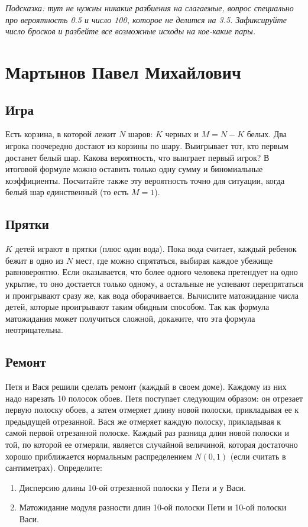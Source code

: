 \documentclass[12pt]{article}
\begin{document}
\emph{Подсказка: тут не нужны никакие разбиения на слагаемые, вопрос специально про вероятность 0.5 и число 100, которое не делится на 3.5. Зафиксируйте число бросков и разбейте все возможные исходы на кое-какие пары.}

\newpage
\section{Мартынов Павел Михайлович}

\subsection{Игра}
Есть корзина, в которой лежит $N$ шаров: $K$ черных и $M = N - K$ белых. Два игрока поочередно достают из корзины по шару. Выигрывает тот, кто первым достанет белый шар. Какова вероятность, что выиграет первый игрок? В итоговой формуле можно оставить только одну сумму и биномиальные коэффициенты. Посчитайте также эту вероятность точно для ситуации, когда белый шар единственный (то есть $M = 1$).

\subsection{Прятки}
$K$ детей играют в прятки (плюс один вода). Пока вода считает, каждый ребенок бежит в одно из $N$ мест, где можно спрятаться, выбирая каждое убежище равновероятно. Если оказывается, что более одного человека претендует на одно укрытие, то оно достается только одному, а остальные не успевают перепрятаться и проигрывают сразу же, как вода оборачивается. Вычислите матожидание числа детей, которые проигрывают таким обидным способом. Так как формула матожидания может получиться сложной, докажите, что эта формула неотрицательна.

\subsection{Ремонт}
Петя и Вася решили сделать ремонт (каждый в своем доме). Каждому из них надо нарезать 10 полосок обоев. Петя поступает следующим образом: он отрезает первую полоску обоев, а затем отмеряет длину новой полоски, прикладывая ее к предыдущей отрезанной. Вася же отмеряет каждую полоску, прикладывая к самой первой отрезанной полоске. Каждый раз разница длин новой полоски и той, по которой ее отмеряли, является случайной величиной, которая достаточно хорошо приближается нормальным распределением $N(0, 1)$ (если считать в сантиметрах). Определите:
\begin{enumerate}
    \item Дисперсию длины 10-ой отрезанной полоски у Пети и у Васи.
    \item Матожидание модуля разности длин 10-ой полоски Пети и 10-ой полоски Васи. 
\end{enumerate}
\end{document}
